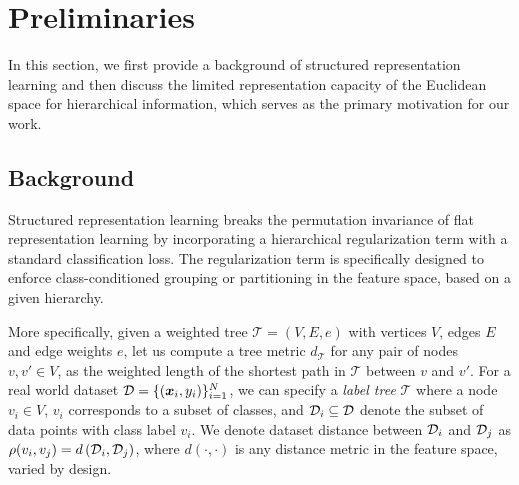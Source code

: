 \section{Preliminaries}
\label{sec:l2cpcc}
In this section, we first provide a background of structured representation learning and then discuss the limited representation capacity of the Euclidean space for hierarchical information, which serves as the primary motivation for our work. 

\subsection{Background}

Structured representation learning \citep{zeng2022learning} breaks the permutation invariance of flat representation learning by incorporating a hierarchical regularization term with a standard classification loss. The regularization term is specifically designed to enforce class-conditioned grouping or partitioning in the feature space, based on a given hierarchy.

More specifically, given a weighted tree $\mathcal{T} = (V, E, e)$ with vertices $V$, edges $E$ and edge weights $e$, let us compute a tree metric $d_\mathcal{T}$ for any pair of nodes $v,v' \in V$, as the weighted length of the shortest path in $\mathcal{T}$ between $v$ and $v'$. For a real world dataset ${\mathcal{D}} = \{({\bm{x}}_i, y_i)\}_{i = 1}^N$, we can specify a \emph{label tree} $\mathcal{T}$ where a node $v_i\in V$,  $v_i$ corresponds to a subset of classes, and ${\mathcal{D}}_i\subseteq {\mathcal{D}}$ denote the subset of data points with class label $v_i$. We denote dataset distance between ${\mathcal{D}}_i$ and ${\mathcal{D}}_j$ as $\rho(v_i, v_j) = d\left({\mathcal{D}}_i,{\mathcal{D}}_j\right)$, where $d(\cdot, \cdot)$ is any distance metric in the feature space, varied by design.

